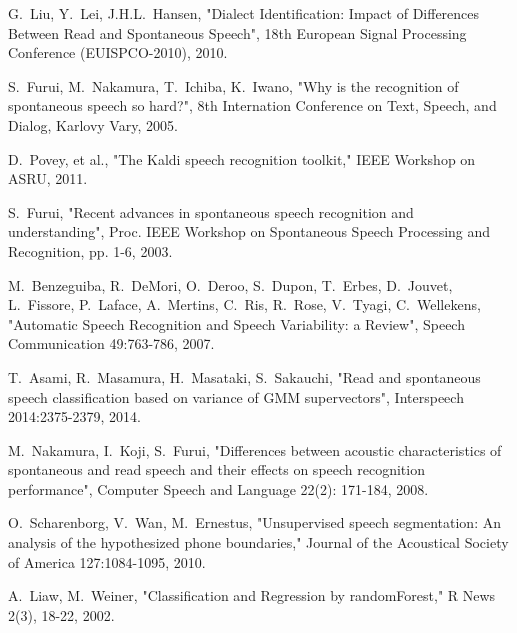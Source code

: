 \documentclass[conference]{IEEEtran}
\begin{document}
\begin{thebibliography}{1}
G.~Liu, Y.~Lei, J.H.L.~Hansen,
    "Dialect Identification: Impact of Differences Between Read and Spontaneous Speech",
    18th European Signal Processing Conference (EUISPCO-2010), 2010.

S.~Furui, M.~Nakamura, T.~Ichiba, K.~Iwano,
	"Why is the recognition of spontaneous speech so hard?",
	8th Internation Conference on Text, Speech, and Dialog,
	Karlovy Vary, 2005.

D.~Povey, et al.,
    "The Kaldi speech recognition toolkit,"
    IEEE Workshop on ASRU, 2011.

S.~Furui,
    "Recent advances in spontaneous speech recognition and understanding",
    Proc. IEEE Workshop on Spontaneous Speech Processing and Recognition, pp. 1-6, 2003.

M.~Benzeguiba, R.~DeMori, O.~Deroo, S.~Dupon, T.~Erbes, D.~Jouvet, L.~Fissore, P.~Laface, A.~Mertins, C.~Ris, R.~Rose, V.~Tyagi, C.~Wellekens,
	"Automatic Speech Recognition and Speech Variability: a Review",
	Speech Communication 49:763-786, 2007.

T.~Asami, R.~Masamura, H.~Masataki, S.~Sakauchi,
    "Read and spontaneous speech classification based on variance of GMM supervectors",
	Interspeech 2014:2375-2379, 2014.

M.~Nakamura, I.~Koji, S.~Furui,
    "Differences between acoustic characteristics of spontaneous and read speech and their effects on speech recognition performance",
    Computer Speech and Language 22(2): 171-184, 2008.

O.~Scharenborg, V.~Wan, M.~Ernestus,
    "Unsupervised speech segmentation: An analysis of the hypothesized phone boundaries,"
    Journal of the Acoustical Society of America 127:1084-1095, 2010.

A.~Liaw, M.~Weiner,
    "Classification and Regression by randomForest,"
    R News 2(3), 18-22, 2002.

\end{thebibliography}



\end{document}
